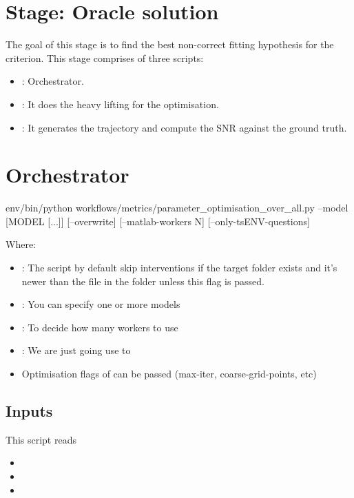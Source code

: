 \documentclass[11pt]{article}
\begin{document}
\label{docstart:oracle_solution}

\section{Stage: Oracle solution}
The goal of this stage is to find the best non-correct fitting hypothesis for the criterion.
This stage comprises of three scripts:
\begin{itemize}
\item {}: Orchestrator.
\item {}: It does the heavy lifting for the optimisation.
\item {}: It generates the trajectory and compute the SNR against the ground truth.
\end{itemize}

\section{Orchestrator}
\begin{DocCode}
env/bin/python workflows/metrics/parameter_optimisation_over_all.py --model [MODEL [...]] [--overwrite] [--matlab-workers N] [--only-tsENV-questions]
\end{DocCode}
Where:
\begin{itemize}
    \item {}: The script by default skip interventions if the target folder exists and it's newer than the  file in the folder unless this flag is passed.
    \item {}: You can specify one or more models
    \item {}: To decide how many workers to use
    \item {}: We are just going use to 
    \item Optimisation flags of  can be passed (max-iter, coarse-grid-points, etc)
\end{itemize}

\subsection{Inputs}
This script reads 
\begin{itemize}
  \item {}
  \item {}
  \item {}
\end{itemize}
\end{document}
